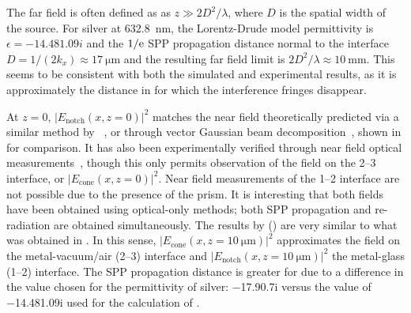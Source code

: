 The far field is often defined as as $z\gg 2 D^2/\lambda$, where $D$ is the
spatial width of the source.  For silver at \SI{632.8}{\nano\meter}, the
Lorentz-Drude
model permittivity is $\epsilon = \num{-14.48+1.09i}$ and the $1/{\mathrm{e}}$ SPP
propagation distance normal to the interface $D = 1/(2 k_x) \approx
\SI{17}{\micro\meter}$ and the resulting far field limit is $2 D^2/\lambda
\approx \SI{10}{\milli\meter}$.  This seems to be consistent with both the
simulated and experimental results, as it is approximately the distance in
 for which the interference fringes disappear.

At $z=0$, $|E_\text{notch}(x,z=0)|^2$ matches the near field theoretically
predicted via a similar method by ~\cite{chuang1986lateral}, or
through vector Gaussian beam decomposition~\cite{baida1999theoretical}, shown
in  for comparison.  It has also been experimentally
verified through near field optical measurements~\cite{dawson2001surface},
though this only permits observation of the field on the 2--3 interface, or
$|E_\text{cone}(x,z=0)|^2$.  Near field measurements of the 1--2 interface are
not possible due to the presence of the prism.  It is interesting that both
fields have been obtained using optical-only methods; both SPP propagation and
re-radiation are obtained simultaneously.  The results by 
() are very similar to what was obtained in
.  In this sense,
$|E_\text{cone}(x,z=\SI{10}{\micro\meter})|^2$ approximates the field on the
metal-vacuum/air (2--3) interface and
$|E_\text{notch}(x,z=\SI{10}{\micro\meter})|^2$ the metal-glass (1--2)
interface.  The SPP propagation distance is greater for  due to a
difference in the value chosen for the permittivity of silver:
\num{-17.9+0.7i} versus the value of \num{-14.48+1.09i} used for the
calculation of .

